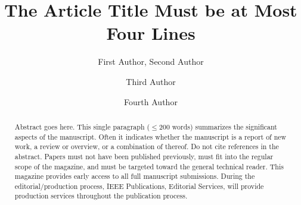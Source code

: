\documentclass{IEEEmce}
\begin{document}


\title{The Article Title Must be at Most Four Lines}


\author{First Author, Second Author}



\author{Third Author}

\author{Fourth Author}




\begin{abstract} Abstract goes here. This single paragraph ($\le$200 words) summarizes the significant aspects of the manuscript. Often it indicates whether the manuscript is a report of new work, a review or overview, or a combination of thereof. Do not cite references in the abstract. Papers must not have been published previously, must fit into the regular scope of the magazine, and must be targeted toward the general technical reader. This magazine provides early access to all full manuscript submissions. During the editorial/production process, IEEE Publications, Editorial Services, will provide production services throughout the publication process.\end{abstract}

\maketitle
\end{document}
